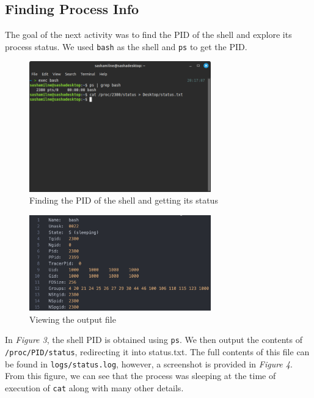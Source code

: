 \subsection{Finding Process Info}\label{subsec:finding-process-info}
The goal of the next activity was to find the PID of the shell and explore its process status.
We used \texttt{bash} as the shell and \texttt{ps} to get the PID\@.
\begin{figure}[H]
    \centering
    \includegraphics[width=0.7\textwidth]{../../screenshots/step4-ps}
    \caption{Finding the PID of the shell and getting its status}
    \label{fig:step4-ps}
\end{figure}
\begin{figure}[H]
        \centering
        \includegraphics[width=0.7\textwidth]{../../screenshots/step5-status}
        \caption{Viewing the output file}
        \label{fig:step5-status}
    \end{figure}
\afterfloat
In \textit{Figure 3}, the shell PID is obtained using \texttt{ps}.
We then output the contents of \texttt{/proc/PID/status}, redirecting it into status.txt.
The full contents of this file can be found in \texttt{logs/status.log},
however, a screenshot is provided in \textit{Figure 4}.
From this figure, we can see that the process was sleeping at the
time of execution of \texttt{cat} along with many other details.

